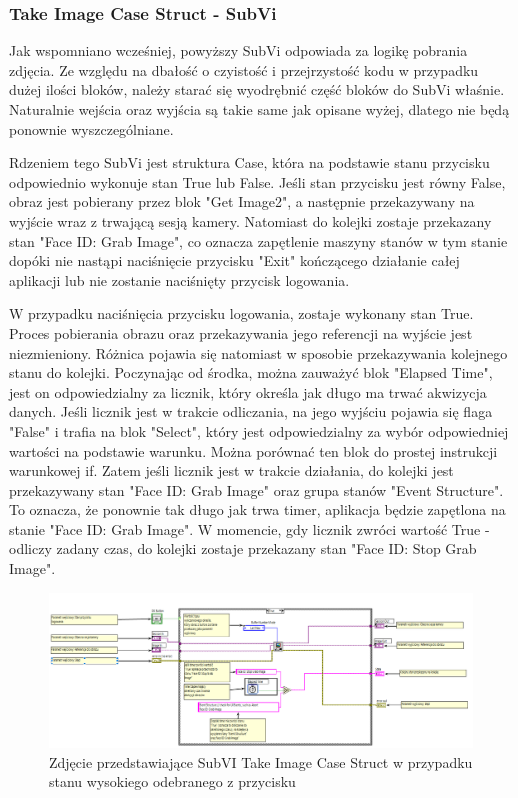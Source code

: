 \documentclass{report}
\begin{document}
\subsubsection*{Take Image Case Struct - SubVi}

Jak wspomniano wcześniej, powyższy SubVi odpowiada za logikę pobrania zdjęcia. Ze względu na dbałość o czyistość i przejrzystość kodu w przypadku dużej ilości bloków, należy starać się wyodrębnić część bloków do SubVi właśnie. Naturalnie wejścia oraz wyjścia są takie same jak opisane wyżej, dlatego nie będą ponownie wyszczególniane. 

Rdzeniem tego SubVi jest struktura Case, która na podstawie stanu przycisku odpowiednio wykonuje stan True lub False. 
Jeśli stan przycisku jest równy False, obraz jest pobierany przez blok "Get Image2", a następnie przekazywany na wyjście wraz z trwającą sesją kamery. Natomiast do kolejki zostaje przekazany stan "Face ID: Grab Image", co oznacza zapętlenie maszyny stanów w tym stanie dopóki nie nastąpi naciśnięcie przycisku "Exit" kończącego działanie całej aplikacji lub nie zostanie naciśnięty przycisk logowania. 

W przypadku naciśnięcia przycisku logowania, zostaje wykonany stan True. Proces pobierania obrazu oraz przekazywania jego referencji na wyjście jest niezmieniony. Różnica pojawia się natomiast w sposobie przekazywania kolejnego stanu do kolejki. Poczynając od środka, można zauważyć blok "Elapsed Time", jest on odpowiedzialny za licznik, który określa jak długo ma trwać akwizycja danych. Jeśli licznik jest w trakcie odliczania, na jego wyjściu pojawia się flaga "False" i trafia na blok "Select", który jest odpowiedzialny za wybór odpowiedniej wartości na podstawie warunku. Można porównać ten blok do prostej instrukcji warunkowej if. Zatem jeśli licznik jest w trakcie działania, do kolejki jest przekazywany stan "Face ID: Grab Image" oraz grupa stanów "Event Structure". To oznacza, że ponownie tak długo jak trwa timer, aplikacja będzie zapętlona na stanie "Face ID: Grab Image". W momencie, gdy licznik zwróci wartość True - odliczy zadany czas, do kolejki zostaje przekazany stan "Face ID: Stop Grab Image". 

\begin{figure}[H]
    \centering
    \includegraphics[width=1.0\textwidth]{src/face-id/face-id-case.png}
    \caption{Zdjęcie przedstawiające SubVI Take Image Case Struct w przypadku stanu wysokiego odebranego z przycisku}
    \label{fig:face_id-grab-case}
\end{figure}
\end{document}
